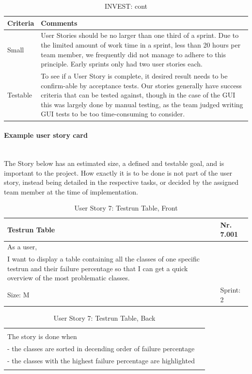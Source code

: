 \begin{table}[h!]
  \caption{INVEST: cont}
  \centering
  \begin{tabular}{|p{3cm} | p{10cm}|}
	\hline  	 
  	 Criteria & Comments \\ 
  	 \hline
  	 \hline
  	Small & User Stories should be no larger than one third of a sprint. Due to the limited amount of work time in a sprint, less than 20 hours per team member, we frequently did not manage to adhere to this principle. Early sprints only had two user stories each.  \\ 
  	\hline
  	Testable & To see if a User Story is complete, it desired result needs to be confirm-able by acceptance tests. Our stories generally have success criteria that can be tested against, though in the case of the GUI this was largely done by manual testing, as the team judged writing GUI tests to be too time-consuming to consider. \\ 
  	\hline
  \end{tabular}
\end{table}

\paragraph{Example user story card} 
\ \\
The Story below has an estimated size, a defined and testable goal, and is important to the project. How exactly it is to be done is not part of the user story, instead being detailed in the respective tasks, or decided by the assigned team member at the time of implementation. 
\begin{table}[h]
  \caption{User Story 7: Testrun Table, Front}
  \label{Story 7 Example}
  \centering
  \begin{tabular}{|p{9cm} p{2cm}|}
	\hline  	
  	Testrun Table & Nr. 7.001  \\ 
  	\hline
  	As a user, &    \\ 
  	I want to display a table containing all the classes of one specific testrun and their failure percentage so that I can get a quick overview of the most problematic classes. &    \\ 
  	Size: M & Sprint: 2 \\ 
  	\hline
  \end{tabular}
\end{table}
\begin{table}[!h]
  \caption{User Story 7: Testrun Table, Back}
  \label{Story 7 Example}  \centering
  \begin{tabular}{|p{10cm} p{1cm}|}
    \hline
  	  &    \\ 
  	The story is done when &    \\ 
  	 - the classes are sorted in decending order of failure percentage &    \\ 
  	 - the classes with the highest failure percentage are highlighted &   \\ 
  	  &     \\ 
  	\hline
  \end{tabular}
\end{table}

